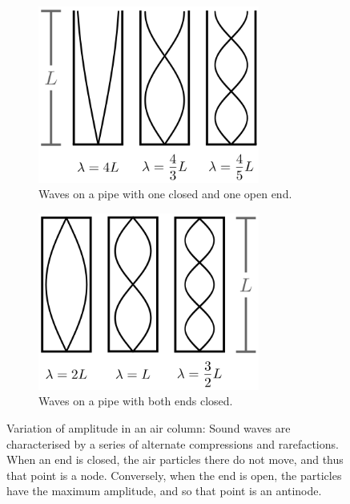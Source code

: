 \begin{refsection}
\begin{figure}[!htb]
    \centering
    \begin{subfigure}[b]{0.5\textwidth}
        \centering
\includegraphics[width=0.8\textwidth]{figs/wavesInAHalfOpenPipe.png}
                \caption{Waves on a pipe with one closed and one open end.}
                \label{fig:wavesInAHalfOpenPipe}
        \end{subfigure}\hfill
        \begin{subfigure}[b]{0.5\textwidth}
        \centering
                \includegraphics[width=0.8\textwidth]{figs/wavesInAClosedPipe.png}
                \caption{Waves on a pipe with both ends closed.}
                \label{fig:wavesInAClosedPipe}
        \end{subfigure}
    \caption{Variation of amplitude in an air column: Sound waves are characterised by a series of alternate compressions and rarefactions. When an end is closed, the air particles there do not move, and thus that point is a node. Conversely, when the end is open, the particles have the maximum amplitude, and so that point is an antinode.}
    \label{fig:wavesInAPipe}
\end{figure}



\end{refsection}
